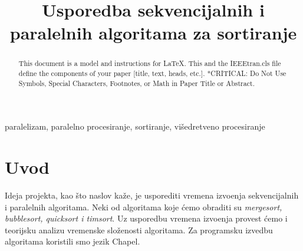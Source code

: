\documentclass[conference]{IEEEtran}
\begin{document}
\title{Usporedba sekvencijalnih i paralelnih algoritama za sortiranje\\

}

\author{
\and
{}
\and
{}
}

\maketitle

\begin{abstract}
This document is a model and instructions for \LaTeX.
This and the IEEEtran.cls file define the components of your paper [title, text, heads, etc.]. *CRITICAL: Do Not Use Symbols, Special Characters, Footnotes, 
or Math in Paper Title or Abstract.
\end{abstract}

\begin{IEEEkeywords}
paralelizam, paralelno procesiranje, sortiranje, višedretveno procesiranje
\end{IEEEkeywords}

\section{Uvod}
Ideja projekta, kao što naslov kaže, je usporediti vremena izvo\dj enja sekvencijalnih i paralelnih algoritama. Neki od algoritama koje ćemo obraditi su \textit{mergesort, bubblesort, quicksort i timsort}. Uz usporedbu vremena izvo\dj enja provest ćemo i teorijsku analizu vremenske složenosti algoritama. Za programsku izvedbu algoritama koristili smo jezik Chapel.
\end{document}

